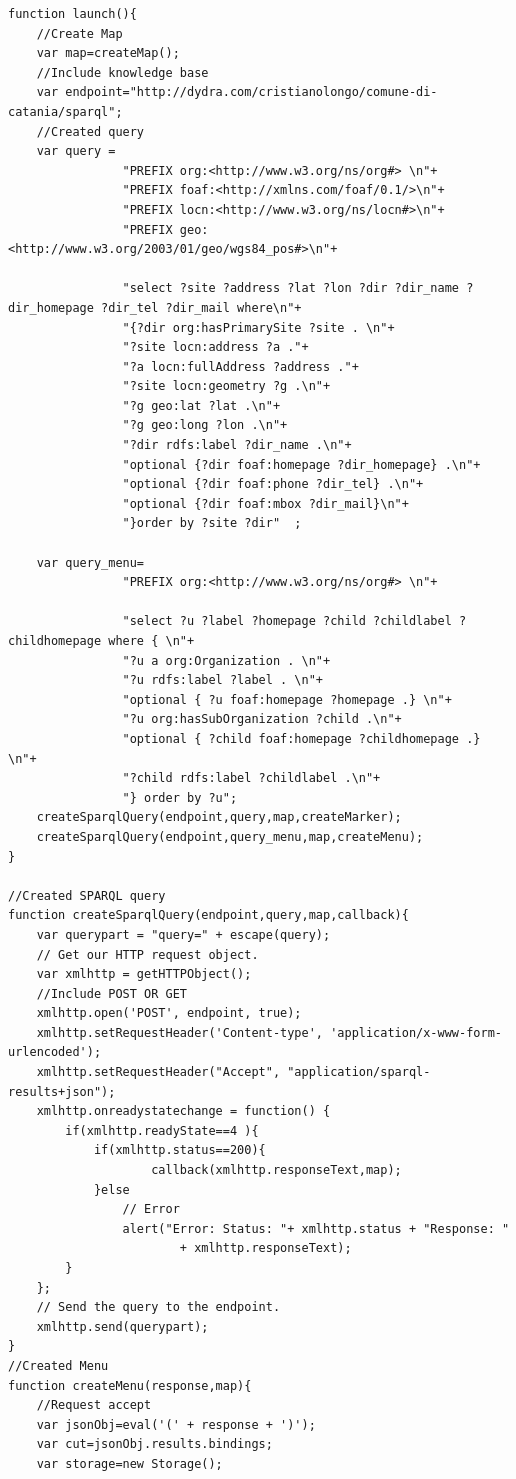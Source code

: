 \documentclass[a4paper,11pt]{article}
\begin{document}
\begin{lstlisting}[style=htmlcssjs]
function launch(){
	//Create Map
	var map=createMap();
	//Include knowledge base
	var endpoint="http://dydra.com/cristianolongo/comune-di-catania/sparql";
	//Created query
	var query = 
				"PREFIX org:<http://www.w3.org/ns/org#> \n"+
				"PREFIX foaf:<http://xmlns.com/foaf/0.1/>\n"+
				"PREFIX locn:<http://www.w3.org/ns/locn#>\n"+
				"PREFIX geo:<http://www.w3.org/2003/01/geo/wgs84_pos#>\n"+

				"select ?site ?address ?lat ?lon ?dir ?dir_name ?dir_homepage ?dir_tel ?dir_mail where\n"+
				"{?dir org:hasPrimarySite ?site . \n"+
				"?site locn:address ?a ."+
				"?a locn:fullAddress ?address ."+
				"?site locn:geometry ?g .\n"+
				"?g geo:lat ?lat .\n"+
				"?g geo:long ?lon .\n"+
				"?dir rdfs:label ?dir_name .\n"+
				"optional {?dir foaf:homepage ?dir_homepage} .\n"+
				"optional {?dir foaf:phone ?dir_tel} .\n"+
				"optional {?dir foaf:mbox ?dir_mail}\n"+
				"}order by ?site ?dir"  ;
	
	var query_menu=
				"PREFIX org:<http://www.w3.org/ns/org#> \n"+

				"select ?u ?label ?homepage ?child ?childlabel ?childhomepage where { \n"+
				"?u a org:Organization . \n"+
				"?u rdfs:label ?label . \n"+
				"optional { ?u foaf:homepage ?homepage .} \n"+
				"?u org:hasSubOrganization ?child .\n"+
				"optional { ?child foaf:homepage ?childhomepage .} \n"+
				"?child rdfs:label ?childlabel .\n"+
				"} order by ?u";
	createSparqlQuery(endpoint,query,map,createMarker);
	createSparqlQuery(endpoint,query_menu,map,createMenu);
}

//Created SPARQL query
function createSparqlQuery(endpoint,query,map,callback){	
	var querypart = "query=" + escape(query);
	// Get our HTTP request object.
	var xmlhttp = getHTTPObject();
	//Include POST OR GET
	xmlhttp.open('POST', endpoint, true); 
	xmlhttp.setRequestHeader('Content-type', 'application/x-www-form-urlencoded');
	xmlhttp.setRequestHeader("Accept", "application/sparql-results+json");	
	xmlhttp.onreadystatechange = function() {
		if(xmlhttp.readyState==4 ){
			if(xmlhttp.status==200){				
					callback(xmlhttp.responseText,map);
			}else
				// Error
				alert("Error: Status: "+ xmlhttp.status + "Response: "
						+ xmlhttp.responseText);
		}	
	};
	// Send the query to the endpoint.
	xmlhttp.send(querypart);	
}
//Created Menu
function createMenu(response,map){	
	//Request accept				
	var jsonObj=eval('(' + response + ')');	
	var cut=jsonObj.results.bindings;
	var storage=new Storage();
	

\end{lstlisting}
\end{document}
